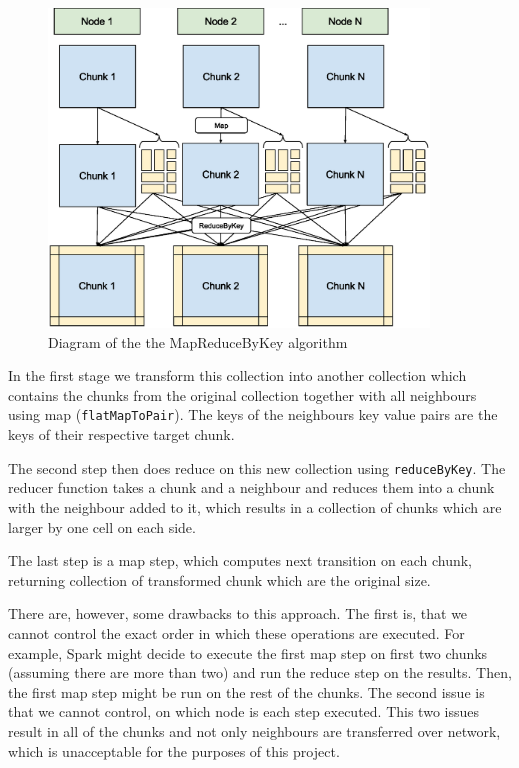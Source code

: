 \documentclass{l4proj}
\begin{document}
\begin{figure}
\centering
\includegraphics[width=0.9\textwidth]{images/MapReduce.eps}
\caption{Diagram of the the MapReduceByKey algorithm}
\label{fig:map_reduce}
\end{figure}

In the first stage we transform this collection into another collection which contains
the chunks from the original collection together with all neighbours using map
(\texttt{flatMapToPair}). The keys of the neighbours key value pairs are the keys of their respective
target chunk.

The second step then does reduce on this new collection using \texttt{reduceByKey}. 
The reducer function takes a chunk and a neighbour and reduces them into a chunk
with the neighbour added to it, which results in a collection of chunks which are
larger by one cell on each side.

The last step is a map step, which computes next transition on each chunk, returning
collection of transformed chunk which are the original size.

There are, however, some drawbacks to this approach. The first is, that we cannot
control the exact order in which these operations are executed. For example, Spark
might decide to execute the first map step on first two chunks (assuming there are more than two)
and run the reduce step on the results. Then, the first map step might be run on the rest
of the chunks. The second issue is that we cannot control, on which node is each step 
executed. This two issues result in all of the chunks and not only neighbours are
transferred over network, which is unacceptable for the purposes of this project.
\end{document}
